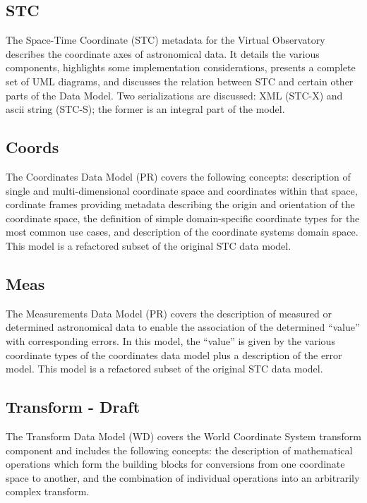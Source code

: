 \documentclass[11pt,a4paper]{ivoa}
\begin{document}
\subsection{STC}

The Space-Time Coordinate (STC) \citep{2007ivoa.spec.1030R} metadata for the Virtual Observatory describes the coordinate 
axes of astronomical data. It details the various components, highlights some implementation 
considerations, presents a complete set of UML diagrams, and discusses the relation between 
STC and certain other parts of the Data Model. Two serializations are discussed: XML (STC-X) and
ascii string (STC-S); the former is an integral part of the model.

\subsection{Coords}

The Coordinates Data Model (PR) covers the following concepts: description of single and multi-dimensional 
coordinate space and coordinates within that space, cordinate frames providing metadata describing the 
origin and orientation of the coordinate space, the definition of simple domain-specific coordinate
types for the most common use cases, and description of the coordinate systems domain space. This
model is a refactored subset of the original STC data model.

\subsection{Meas}

The Measurements Data Model (PR) covers the description of measured or determined astronomical data 
to enable the association of the determined ``value'' with corresponding errors. In this model, 
the ``value'' is given by the various coordinate types of the coordinates data model plus a 
description of the error model.  This model is a refactored subset of the original STC data model.

\subsection{Transform - Draft}

The Transform Data Model (WD) covers the World Coordinate System transform component and includes 
the following concepts: the description of mathematical operations which form the building 
blocks for conversions from one coordinate space to another, and the combination of individual 
operations into an arbitrarily complex transform.
 
\end{document}
